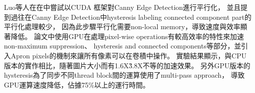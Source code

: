 \documentclass[sigconf,nonacm]{acmart}
\begin{document}
Luo等人在在\cite{4563088}中嘗試以CUDA 框架對Canny Edge Detection進行平行化，
並且提到過往在Canny Edge Detection中hysteresis labeling connected component part的平行化處理較少，
因為此步驟平行化需要non-local memory，導致速度與效率顯著降低。
論文中使用GPU在處理pixel-wise operations有較高效率的特性來加速non-maximum suppression、
hysteresis and connected components等部分，並引入Apron pixels的機制來讓所有像素可以在卷積中操作。
實驗結果顯示，與CPU版本的實作相比，隨著圖片大小而有1.6X\~3.8X不等的加速效果。
另外GPU版本的hysteresis為了同步不同thread block間的運算使用了multi-pass approach，
導致GPU運算速度降低，佔據75\%以上的運行時間。









\end{document}
